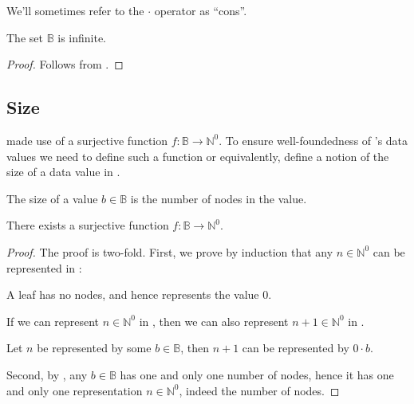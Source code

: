 We'll sometimes refer to the $\cdot$ operator as ``cons''.

\begin{theorem}\label{theorem:infinite-values} The set $\mathbb{B}$ is
infinite.\end{theorem}

\begin{proof} Follows from .\end{proof}

\subsection{Size}

 made use of a surjective function $f :
\mathbb{B}\rightarrow\mathbb{N}^0$. To ensure well-foundedness of \D{}'s data
values we need to define such a function or equivalently, define a notion of
the size of a data value in \D{}.

\begin{definition}\label{definition:size} The size of a value $b\in\mathbb{B}$
is the number of nodes in the value.\end{definition}

\begin{theorem}\label{theorem:type-is-well-founded} There exists a surjective
function $f:\mathbb{B}\rightarrow\mathbb{N}^0$.\end{theorem}

\begin{proof} The proof is two-fold. First, we prove by induction that any
$n\in\mathbb{N}^0$ can be represented in \D{}:

\begin{description}[\setleftmargin{70pt}\setlabelstyle{\bf}]

\item [Base case] A leaf has no nodes, and hence represents the value $0$.

\item [Assumption] If we can represent $n\in\mathbb{N}^0$ in \D{}, then we can
also represent $n+1\in\mathbb{N}^0$ in \D{}. 

\item [Induction] Let $n$ be represented by some $b\in\mathbb{B}$, then $n+1$
can be represented by $0\cdot b$. 

\end{description}

Second, by , any $b\in\mathbb{B}$ has one and only
one number of nodes, hence it has one and only one representation
$n\in\mathbb{N}^0$, indeed the number of nodes.\end{proof}

